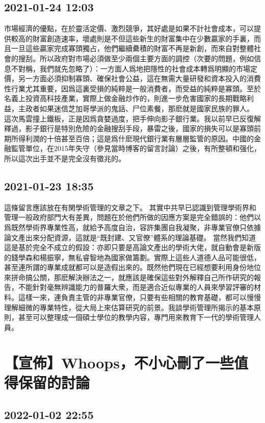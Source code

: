 \documentclass[twocolumn]{ctexart}
\begin{document}
\subsection*{2021-01-24 12:03}

市場經濟的優點，在於靈活定價、激烈競爭，其好處是如果不計社會成本，可以提供較高的財富創造速率，壞處則是不但這些新生的財富集中在少數贏家的手裏，而且一旦這些贏家完成寡頭獨占，他們繼續纍積的財富不再是新創，而來自對整體社會的搜刮。所以政府對市場必須做至少兩個主要方面的調控（次要的問題，例如信息不對稱，我們就先忽略了）：一方面人爲地把隱性的社會成本轉爲明顯的市場定價，另一方面必須抑制寡頭、確保社會公益，這在無需大量研發和資本投入的消費性行業尤其重要，因爲這裏受損的純粹是一般消費者，而受益的純粹是寡頭。至於名義上投資高科技產業，實際上做金融炒作的，則進一步危害國家的長期戰略利益，主政者如果迷信芝加哥學派的鬼話、尸位素餐，那麽就是國家民族的罪人。
這次馬雲撞上鐵板，正是因爲貪婪過度，把手伸向影子銀行業。我以前早已反復解釋過，影子銀行是特別危險的金融搜刮手段，暴雷之後，國家的損失可以是寡頭前期所得利潤的十倍甚至百倍；這是爲什麽現代銀行業有層層監管的原因。中國的金融監管單位，在2015年失守（參見當時博客的留言討論）之後，有所整頓和强化，所以這次出手並不是完全沒有徵兆的。
\subsection*{2021-01-23 18:35}

這條留言應該放在有関學術管理的文章之下。
其實中共早已認識到管理學術界和管理一般政府部門大有差異，問題在於他們所做的因應方案是完全錯誤的：他們以爲既然學術界專業性高，就給予高度自治，容許集團自我凝聚，非專業官僚只依據論文產出來分配資源，這就是“既封建、又官僚”體系的理論基礎。
當然我們知道這是基於完全不成立的假設：亦即只要是高論文產出的學術大佬，就自動會是新版的錢學森和楊振寧，無私睿智地為國家做籌劃。實際上這些人道德人品可能很低，甚至連所謂的專業成就都可以是造假出來的。既然他們現在已經想要利用身份地位來拼命搞公關，那麽解決辦法之一，就應該是確保這些對外解釋自己所作研究的報告，不能針對毫無辨識能力的普羅大衆，而是適合近似專業的人員來學習評審的材料。這樣一來，連負責主管的非專業官僚，只要有些相關的教育基礎，都可以慢慢理解細微的專業特性，從大局上來估算研究的前景。我談學術管理所揭示的基本原則，甚至可以整理成一個碩士學位的教學内容，專門用來教育下一代的學術管理人員。
\section*{【宣佈】Whoops，不小心刪了一些值得保留的討論}
\subsection*{2022-01-02 22:55}
\end{document}
